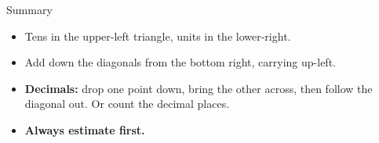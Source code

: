 \documentclass[10pt,aspectratio=169]{beamer}
\begin{document}
\begin{frame}{Summary}
\begin{center}
    \begin{minipage}{0.88\textwidth}
      \begin{itemize}
        \item Tens in the upper-left triangle, units in the lower-right.
        \item Add down the diagonals from the bottom right, carrying up-left.
        \item \textbf{Decimals:} drop one point down, bring the other across, then
              follow the diagonal out. Or count the decimal places.
        \item \textbf{Always estimate first.}
      \end{itemize}
    \end{minipage}
  \end{center}
\end{frame}
\end{document}

